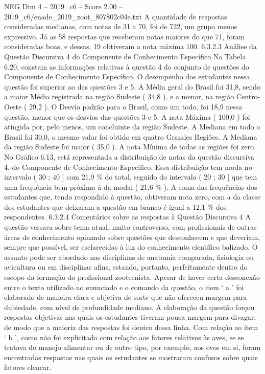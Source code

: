 \begin{textsample}{NEG Dim 4 – 2019\_c6 – Score 2.00 – 2019\_c6/enade\_2019\_zoot\_807802c04e.txt}
A quantidade de respostas consideradas medianas, com notas de 31 a 70, foi de 722, um grupo menos expressivo.
Já as 58 respostas que receberam notas maiores do que 71, foram consideradas boas, e dessas, 19 obtiveram a nota máxima 100. 6.3.2.3 Análise da Questão Discursiva 4 do Componente de Conhecimento Específico Na Tabela 6.20, constam as informações relativas à questão 4 do conjunto de questões do Componente de Conhecimento Específico.
O desempenho dos estudantes nessa questão foi superior ao das questões 3 e 5.
A Média geral do Brasil foi 31,8, sendo a maior Média registrada na região Sudeste ( 34,8 ), e a menor, na região Centro-Oeste ( 29,2 ).
O Desvio padrão para o Brasil, como um todo, foi 18,9 nessa questão, menor que os desvios das questões 3 e 5.
A nota Máxima ( 100,0 ) foi atingida por, pelo menos, um concluinte da região Sudeste.
A Mediana em todo o Brasil foi 30,0, o mesmo valor foi obtido em quatro Grandes Regiões.
A Mediana da região Sudeste foi maior ( 35,0 ).
A nota Mínima de todas as regiões foi zero.
No Gráfico 6.13, está representada a distribuição de notas da questão discursiva 4, do Componente de Conhecimento Específico.
Essa distribuição tem moda no intervalo ( 30 ; 40 ] com 21,9 \% do total, seguido do intervalo ( 20 ; 30 ] que tem uma frequência bem próxima à da modal ( 21,6 \% ).
A soma das frequências dos estudantes que, tendo respondido à questão, obtiveram nota zero, com a da classe dos estudantes que deixaram a questão em branco é igual a 12,1 \% dos respondentes. 6.3.2.4 Comentários sobre as respostas à Questão Discursiva 4 A questão versava sobre tema atual, muito controverso, com profissionais de outras áreas de conhecimento opinando sobre questões que desconhecem e que deveriam, sempre que possível, ser esclarecidas à luz do conhecimento científico balizado.
O assunto pode ser abordado nas disciplinas de anatomia comparada, fisiologia ou avicultura ou em disciplinas afins, estando, portanto, perfeitamente dentro do escopo da formação do profissional zootecnista.
Apesar de haver certa desconexão entre o texto utilizado no enunciado e o comando da questão, o item ‘ a ’ foi elaborado de maneira clara e objetiva de sorte que não ofereceu margem para dubiedade, com nível de profundidade mediano.
A elaboração da questão forçou respostas objetivas nas quais os estudantes tiveram pouca margem para divagar, de modo que a maioria das respostas foi dentro dessa linha.
Com relação ao item ‘ b ’, como não foi explicitado com relação aos fatores relativos às aves, se se tratava do manejo alimentar ou de outro tipo, por exemplo, aos ovos em si, foram encontradas respostas nas quais os estudantes se mostraram confusos sobre quais fatores elencar.

\end{textsample}
